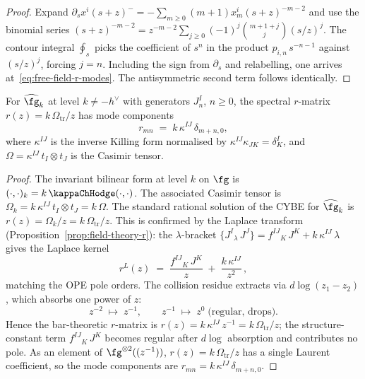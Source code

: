 \begin{proof}
Expand $\partial_s x^i(s+z)^- = -\sum_{m \ge 0}(m+1) x^i_m
(s+z)^{-m-2}$ and use the binomial series
$(s+z)^{-m-2} = z^{-m-2} \sum_{j \ge 0}(-1)^j\binom{m+1+j}{j}
(s/z)^j$.
The contour integral $\oint_s$ picks the coefficient of $s^{n}$
in the product $p_{i,n}\, s^{-n-1}$ against $(s/z)^j$, forcing
$j = n$. Including the sign from $\partial_s$ and
relabelling, one arrives at~\eqref{eq:free-field-r-modes}.
The antisymmetric second term follows identically.
\end{proof}

\begin{proposition}
\label{prop:affine-r-mode}
For $\widehat{\fg}_k$ at level $k \neq -h^\vee$ with
generators $J^I_n$, $n \ge 0$, the spectral $r$-matrix
$r(z) = k\,\Omega_{\mathrm{tr}}/z$ has mode components
\begin{equation}\label{eq:affine-r-mode}
 r_{mn} \;=\; k\,\kappa^{IJ}\,\delta_{m+n,0},
\end{equation}
where $\kappa^{IJ}$ is the inverse Killing form normalised by
$\kappa^{IJ}\kappa_{JK} = \delta^I_K$, and
$\Omega = \kappa^{IJ}\, t_I \otimes t_J$ is the Casimir tensor.
\end{proposition}

\begin{proof}
The invariant bilinear form at level $k$ on $\fg$ is
$(\cdot,\cdot)_k = k\,\kappaChHodge(\cdot,\cdot)$. The associated
Casimir tensor is $\Omega_k = k\,\kappa^{IJ}\,t_I \otimes t_J
= k\,\Omega$. The standard rational solution of the CYBE for
$\widehat{\fg}_k$ is $r(z) = \Omega_k/z = k\,\Omega_{\mathrm{tr}}/z$.
This is confirmed by the Laplace transform
\textup{(}Proposition~\textup{\ref{prop:field-theory-r}}\textup{)}:
the $\lambda$-bracket $\{J^I{}_\lambda\, J^J\}
= f^{IJ}{}_K\, J^K + k\,\kappa^{IJ}\,\lambda$ gives
the Laplace kernel
\[
 r^L(z) \;=\; \frac{f^{IJ}{}_K\,J^K}{z}
 \;+\; \frac{k\,\kappa^{IJ}}{z^2}\,,
\]
matching the OPE pole orders.
The collision residue extracts via $d\log(z_1 - z_2)$,
which absorbs one power of $z$:
\[
 z^{-2} \;\mapsto\; z^{-1}, \qquad
 z^{-1} \;\mapsto\; z^{0}\;\text{(regular, drops)}.
\]
Hence the bar-theoretic $r$-matrix is
$r(z) = k\,\kappa^{IJ}\,z^{-1} = k\,\Omega_{\mathrm{tr}}/z$;
the structure-constant term $f^{IJ}{}_K\,J^K$
becomes regular after $d\log$ absorption and contributes
no pole. As an element of $\fg^{\otimes 2}((z^{-1}))$,
$r(z) = k\,\Omega_{\mathrm{tr}}/z$ has a single Laurent
coefficient, so the mode components are
$r_{mn} = k\,\kappa^{IJ}\,\delta_{m+n,0}$.
\end{proof}

